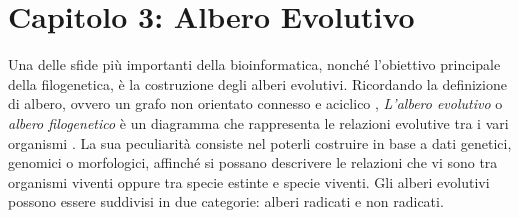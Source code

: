 \chapter{Capitolo 3: Albero Evolutivo}
Una delle sfide più importanti della bioinformatica, nonché l'obiettivo principale della filogenetica, è la costruzione degli alberi evolutivi.
\newline
Ricordando la definizione di albero, ovvero un grafo non orientato connesso e aciclico \cite{algoritmiEStruttureDati2}, \textit{L'albero evolutivo} o \textit{albero filogenetico} è un diagramma che rappresenta le relazioni evolutive tra i vari organismi \cite{buildingaphylogenictree}. La sua peculiarità consiste nel poterli costruire in base a dati genetici, genomici o morfologici, affinché si possano descrivere le relazioni che vi sono tra organismi viventi oppure tra specie estinte e specie viventi.
\newline
Gli alberi evolutivi possono essere suddivisi in due categorie: alberi radicati e non radicati.


